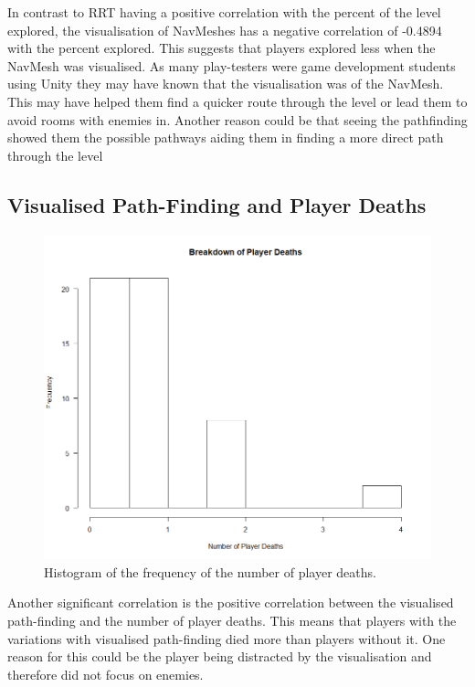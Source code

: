 \documentclass[journal]{IEEEtran}
\begin{document}
	In contrast to RRT having a positive correlation with the percent of the level explored, the visualisation of NavMeshes has a negative correlation of -0.4894 with the percent explored. This suggests that players explored less when the NavMesh was visualised.  As many play-testers were game development students using Unity they may have known that the visualisation was of the NavMesh. This may have helped them find a quicker route through the level or lead them to avoid rooms with enemies in. Another reason could be that seeing the pathfinding showed them the possible pathways aiding them in finding a more direct path through the level
	
	\subsection{Visualised Path-Finding and Player Deaths}
	
	\begin{figure}[h]
		\includegraphics[width=1.0\linewidth]{DeathsHisto.png}
		\caption{Histogram of the frequency of the number of player deaths.}
		\label{graph:DeathsHisto}
	\end{figure}
	Another significant correlation is the positive correlation between the visualised path-finding and the number of player deaths. This means that players with the variations with visualised path-finding died more than players without it. One reason for this could be the player being distracted by the visualisation and therefore did not focus on enemies. 
	
\end{document}
